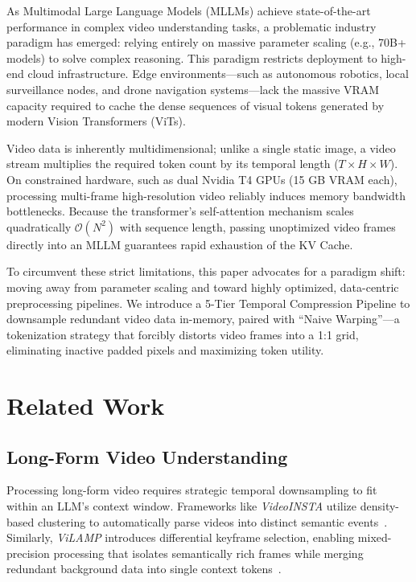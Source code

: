 \documentclass[conference]{IEEEtran}
\newcommand{\bigO}[1]{\mathcal{O}\!\left(#1\right)}
\begin{document}
As Multimodal Large Language Models (MLLMs) achieve state-of-the-art
performance in complex video understanding tasks, a problematic industry
paradigm has emerged: relying entirely on massive parameter scaling
(e.g., 70B+ models) to solve complex reasoning. This paradigm restricts
deployment to high-end cloud infrastructure. Edge environments---such as
autonomous robotics, local surveillance nodes, and drone navigation
systems---lack the massive VRAM capacity required to cache the dense
sequences of visual tokens generated by modern Vision Transformers
(ViTs).

Video data is inherently multidimensional; unlike a single static image,
a video stream multiplies the required token count by its temporal length
($T \times H \times W$). On constrained hardware, such as dual Nvidia T4
GPUs (15 GB VRAM each), processing multi-frame high-resolution video
reliably induces memory bandwidth bottlenecks. Because the transformer's
self-attention mechanism scales quadratically $\bigO{N^2}$ with sequence
length, passing unoptimized video frames directly into an MLLM guarantees
rapid exhaustion of the KV Cache.

To circumvent these strict limitations, this paper advocates for a
paradigm shift: moving away from parameter scaling and toward highly
optimized, data-centric preprocessing pipelines. We introduce a 5-Tier
Temporal Compression Pipeline to downsample redundant video data
in-memory, paired with ``Naive Warping''---a tokenization strategy that
forcibly distorts video frames into a 1:1 grid, eliminating inactive
padded pixels and maximizing token utility.

\section{Related Work}
\label{sec:related}

\subsection{Long-Form Video Understanding}

Processing long-form video requires strategic temporal downsampling to
fit within an LLM's context window. Frameworks like \textit{VideoINSTA}
utilize density-based clustering to automatically parse videos into
distinct semantic events~\cite{liao2024videoinsta}. Similarly,
\textit{ViLAMP} introduces differential keyframe selection, enabling
mixed-precision processing that isolates semantically rich frames while
merging redundant background data into single context
tokens~\cite{cheng2024vilamp}.
\end{document}
